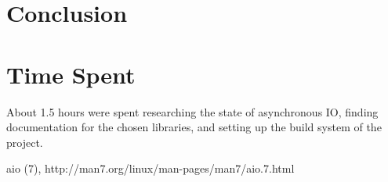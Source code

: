 \documentclass[11pt]{article}
\begin{document}
\section{Conclusion}

\section{Time Spent}

About 1.5 hours were spent researching the state of asynchronous IO, finding
documentation for the chosen libraries, and setting up the build system of the
project.

\begin{thebibliography}{99}
        aio (7), http://man7.org/linux/man-pages/man7/aio.7.html
\end{thebibliography}
\end{document}
